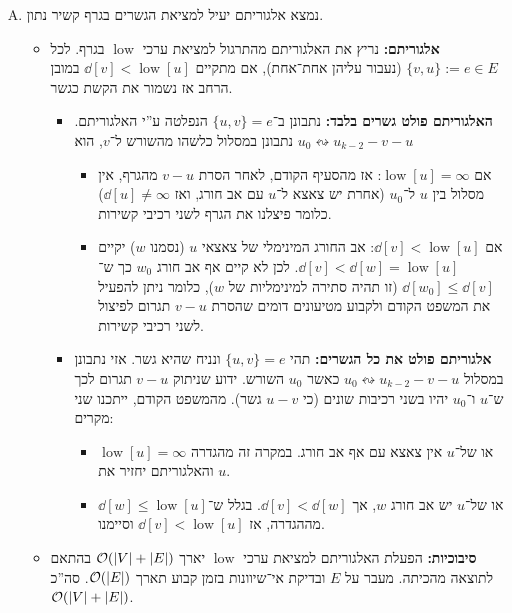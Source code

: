 \documentclass[]{../../../../tex/classes/homework}
\newcommand\squigd{\leftrightsquigarrow}
\DeclareMathOperator{\low}{low}
\begin{document}
\begin{enumerate}[(A)]
\begin{proof}
\begin{itemize}
\begin{itemize}
					סה''כ $T_0$ לא נגיש מתוך $T_k$ ב־$G'$ כולו. בפרט $u_k \in T_k$ לא נגיש ע''י $u_0 \in T_0$, ולכן הם נמצאים ברכיבי קשירות שונים ב־$G'$, וזו סתירה להנחה. 
				\end{itemize}
			\end{itemize}
		\end{proof}
		\item נמצא אלגוריתם יעיל למציאת הגשרים בגרף קשיר נתון. 
		\begin{itemize}
			\item \textbf{אלגוריתם: }נריץ את האלגוריתם מהתרגול למציאת ערכי $\low$ בגרף. לכל $\{v, u\} := e \in E$ (נעבור עליהן אחת־אחת), אם מתקיים $ \dd[v] < \low[u]$ במובן הרחב אז נשמור את הקשת כגשר. 
			\begin{itemize}
				\item \textbf{האלגוריתם פולט גשרים בלבד: }נתבונן ב־$\{u, v\} = e$ הנפלטה ע''י האלגוריתם. נתבונן במסלול כלשהו מהשורש ל־$v$, הוא $u_0 \squigd u_{k -2} - v- u$
				\begin{itemize}[*]
					\item אם $\low[u] = \infty$: אז מהסעיף הקודם, לאחר הסרת $v - u$ מהגרף, אין מסלול בין $u$ ל־$u_0$ (אחרת יש צאצא ל־$u$ עם אב חורג, ואז $\dd[u] \neq \infty$) כלומר פיצלנו את הגרף לשני רכיבי קשירות. 
					\item אם $\dd[v] < \low[u]$: אב החורג המינימלי של צאצאי $u$ (נסמנו $w$) יקיים $\dd[v] < \dd[w] = \low[u]$. לכן לא קיים אף אב חורג $w_0$ כך ש־$\dd[w_0] \le \dd[v]$ (זו תהיה סתירה למינימליות של $w$), כלומר ניתן להפעיל את המשפט הקודם ולקבוע מטיעונים דומים שהסרת $v - u$ תגרום לפיצול לשני רכיבי קשירות. 
				\end{itemize}
				\item \textbf{אלגוריתם פולט את כל הגשרים: }תהי $\{u, v\} = e$ ונניח שהיא גשר. אזי נתבונן במסלול $u_0 \squigd u_{k- 2} - v - u$ כאשר $u_0$ השורש. ידוע שניתוק $v - u$ תגרום לכך ש־$u$ ו־$u_0$ יהיו בשני רכיבות שונים (כי $u - v$ גשר). מהמשפט הקודם, ייתכנו שני מקרים: 
				\begin{itemize}[*]
					\item או של־$u$ אין צאצא עם אף אב חורג. במקרה זה מהגדרה $\low[u] = \infty$ והאלגוריתם יחזיר את $u$. 
					\item או של־$u$ יש אב חורג $w$, אך $\dd[v] < \dd[w]$. בגלל ש־$\dd[w] \le \low[u]$ מההגדרה, אז $\dd[v] < \low[u]$ וסיימנו. 
				\end{itemize}
			\end{itemize}
			\item \textbf{סיבוכיות: }הפעלת האלגוריתם למציאת ערכי $\low$ יארך $\mathcal{O}(\left \lvert V \right \rvert + \left \lvert E \right \rvert)$ בהתאם לתוצאה מהכיתה. מעבר על $E$ ובדיקת אי־שיוונות בזמן קבוע תארך $\mathcal{O}(\left \lvert E \right \rvert)$. סה''כ $\mathcal{O}(\left \lvert V \right \rvert + \left \lvert E \right \rvert)$. 

\end{itemize}
\end{enumerate}
\end{document}

